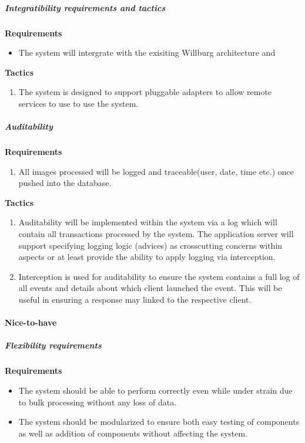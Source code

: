 \documentclass[a4paper,12pt]{report}
\begin{document}
			\subparagraph{Integratibility requirements and tactics}
				\hfill \break
				\hfill \break
				\textbf{Requirements}
					\begin{itemize}
						\item The system will intergrate with the exisiting Willburg architecture and 
					\end{itemize}
				
				\hfill \break
				\textbf{Tactics}
					\begin{enumerate}
						\item The system is designed to support pluggable adapters to allow remote services to use to use the system.
					\end{enumerate}

			\subparagraph{Auditability}
				\hfill \break
				\hfill \break
				\textbf{Requirements}
					\begin{enumerate}
						\item All images processed will be logged and traceable(user, date, time etc.) once pushed into the database.
					\end{enumerate}
				\hfill \break	
				\textbf{Tactics}
					\begin{enumerate}
						\item Auditability will be implemented within the system via a log which will contain all transactions processed by the system. The application server will support specifying logging logic (advices) as crosscutting concerns within aspects or at least provide the ability to apply logging via interception.
						\item Interception is used for auditability to ensure the system contains a full log of all events and details about which client launched the event. This will be useful in ensuring a response may linked to the respective client.
					\end{enumerate}



	\paragraph {Nice-to-have}

		\subparagraph{Flexibility requirements}
			\hfill \break
			\hfill \break
			\textbf{Requirements}
				\begin{itemize}
					\item The system should be able to perform correctly even while under strain due to bulk processing without any loss of data.
					\item The system should be modularized to ensure both easy testing of components as well as addition of components without affecting the system.
				\end{itemize}
\end{document}
